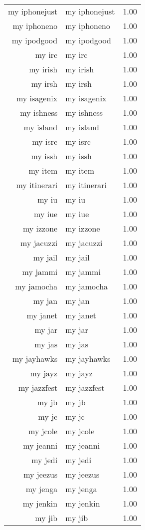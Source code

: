 \begin{table}[ht]
\begin{tabular}{rlr}
  my iphonejust & my iphonejust & 1.00 \\ 
  my iphoneno & my iphoneno & 1.00 \\ 
  my ipodgood & my ipodgood & 1.00 \\ 
  my irc & my irc & 1.00 \\ 
  my irish & my irish & 1.00 \\ 
  my irsh & my irsh & 1.00 \\ 
  my isagenix & my isagenix & 1.00 \\ 
  my ishness & my ishness & 1.00 \\ 
  my island & my island & 1.00 \\ 
  my isrc & my isrc & 1.00 \\ 
  my issh & my issh & 1.00 \\ 
  my item & my item & 1.00 \\ 
  my itinerari & my itinerari & 1.00 \\ 
  my iu & my iu & 1.00 \\ 
  my iue & my iue & 1.00 \\ 
  my izzone & my izzone & 1.00 \\ 
  my jacuzzi & my jacuzzi & 1.00 \\ 
  my jail & my jail & 1.00 \\ 
  my jammi & my jammi & 1.00 \\ 
  my jamocha & my jamocha & 1.00 \\ 
  my jan & my jan & 1.00 \\ 
  my janet & my janet & 1.00 \\ 
  my jar & my jar & 1.00 \\ 
  my jas & my jas & 1.00 \\ 
  my jayhawks & my jayhawks & 1.00 \\ 
  my jayz & my jayz & 1.00 \\ 
  my jazzfest & my jazzfest & 1.00 \\ 
  my jb & my jb & 1.00 \\ 
  my jc & my jc & 1.00 \\ 
  my jcole & my jcole & 1.00 \\ 
  my jeanni & my jeanni & 1.00 \\ 
  my jedi & my jedi & 1.00 \\ 
  my jeezus & my jeezus & 1.00 \\ 
  my jenga & my jenga & 1.00 \\ 
  my jenkin & my jenkin & 1.00 \\ 
  my jib & my jib & 1.00 \\ 

\end{tabular}
\end{table}
